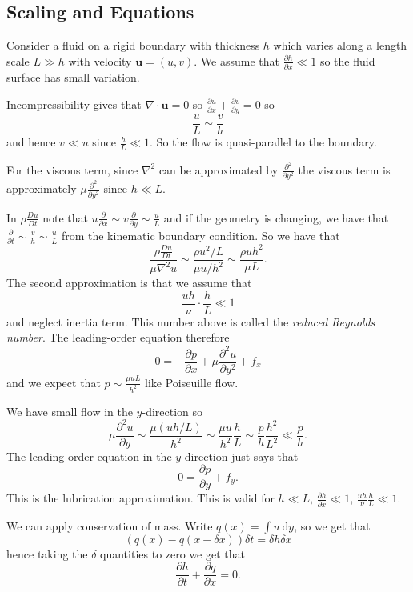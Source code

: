 \documentclass{article}
\begin{document}
\subsection{Scaling and Equations}
Consider a fluid on a rigid boundary with thickness $ h $ which varies along a length scale $ L\gg h $ with velocity $ \mathbf u = (u,v) $. We assume that $ \frac{\partial h}{\partial x} \ll 1 $ so the fluid surface has small variation. \par
Incompressibility gives that $ \nabla\cdot\mathbf u = 0 $ so $ \frac{\partial u}{\partial x} +\frac{\partial v}{\partial y} = 0 $ so 
\[
  \frac uL \sim \frac vh
\]
and hence $ v\ll u $ since $ \frac hL \ll 1 $. So the flow is quasi-parallel to the boundary.
\par
For the viscous term, since $ \nabla^2 $ can be approximated by $ \frac {\partial^2}{\partial y^2} $ the viscous term is approximately $ \mu \frac{\partial^2}{\partial y^2} $ since $ h\ll L $. \par
In $ \rho \frac{Du}{Dt} $ note that $ u\frac{\partial}{\partial x} \sim v\frac{\partial}{\partial y} \sim \frac uL $ and if the geometry is changing, we have that $ \frac \partial{\partial t} \sim \frac vh \sim \frac uL $ from the kinematic boundary condition. So we have that
\[
	\frac{\rho \frac{Du}{Dt}}{\mu \nabla^2 u} \sim \frac{\rho u^2/L}{\mu u/h^2} \sim \frac{\rho uh^2}{\mu L}.
\]
The second approximation is that we assume that 
\[
	\frac{uh}{\nu} \cdot\frac hL \ll 1
\]
and neglect inertia term. This number above is called the \textit{reduced Reynolds number}. The leading-order equation therefore
\[
	0 = - \frac{\partial p}{\partial x} + \mu \frac{\partial^2 u }{\partial y^2} + f_x
\]
and we expect that $ p\sim \frac{\mu uL}{h^2} $ like Poiseuille flow.\par
We have small flow in the $ y $-direction so
\[
	\mu\frac{\partial^2 u}{\partial y} \sim \frac{\mu(uh/L)}{h^2} \sim \frac{\mu u}{h^2} \frac hL \sim \frac ph \frac{h^2}{L^2}\ll \frac ph.
\]
The leading order equation in the $ y $-direction just says that
\[
	0 = \frac{\partial p}{\partial y} + f_y.
\]
This is the lubrication approximation. This is valid for $ h\ll L $, $ \frac{\partial h}{\partial x} \ll 1 $, $ \frac{uh}{\nu}\frac hL \ll 1 $.\par
We can apply conservation of mass. Write $ q(x) = \int u \ \mathrm dy $, so we get that
\[
(q(x) - q(x+\delta x)) \delta t = \delta h \delta x
\]
hence taking the $ \delta $ quantities to zero we get that
\[
	\frac{\partial h}{\partial t} + \frac{\partial q}{\partial x} = 0.
\]
\end{document}
